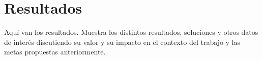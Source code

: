 \chapter{Resultados}
Aquí van los resultados. Muestra los distintos resultados, soluciones y otros
datos de interés discutiendo su valor y su impacto en el contexto del trabajo y
las metas propuestas anteriormente.
